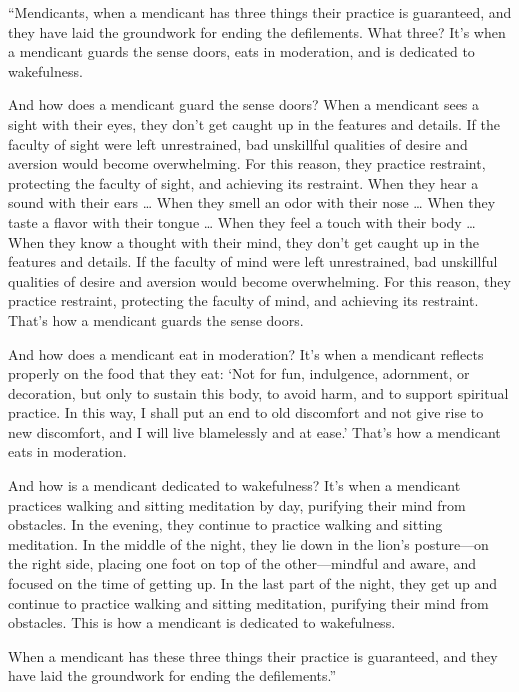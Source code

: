 \documentclass[12pt,openany]{book}%
\begin{document}
“Mendicants, when a mendicant has three things their practice is guaranteed, and they have laid the groundwork for ending the defilements. What three? It’s when a mendicant guards the sense doors, eats in moderation, and is dedicated to wakefulness. 

And how does a mendicant guard the sense doors? When a mendicant sees a sight with their eyes, they don’t get caught up in the features and details. If the faculty of sight were left unrestrained, bad unskillful qualities of desire and aversion would become overwhelming. For this reason, they practice restraint, protecting the faculty of sight, and achieving its restraint. When they hear a sound with their ears … When they smell an odor with their nose … When they taste a flavor with their tongue … When they feel a touch with their body … When they know a thought with their mind, they don’t get caught up in the features and details. If the faculty of mind were left unrestrained, bad unskillful qualities of desire and aversion would become overwhelming. For this reason, they practice restraint, protecting the faculty of mind, and achieving its restraint. That’s how a mendicant guards the sense doors. 

And how does a mendicant eat in moderation? It’s when a mendicant reflects properly on the food that they eat: ‘Not for fun, indulgence, adornment, or decoration, but only to sustain this body, to avoid harm, and to support spiritual practice. In this way, I shall put an end to old discomfort and not give rise to new discomfort, and I will live blamelessly and at ease.’ That’s how a mendicant eats in moderation. 

And how is a mendicant dedicated to wakefulness? It’s when a mendicant practices walking and sitting meditation by day, purifying their mind from obstacles. In the evening, they continue to practice walking and sitting meditation. In the middle of the night, they lie down in the lion’s posture—on the right side, placing one foot on top of the other—mindful and aware, and focused on the time of getting up. In the last part of the night, they get up and continue to practice walking and sitting meditation, purifying their mind from obstacles. This is how a mendicant is dedicated to wakefulness. 

When a mendicant has these three things their practice is guaranteed, and they have laid the groundwork for ending the defilements.” 
\end{document}
